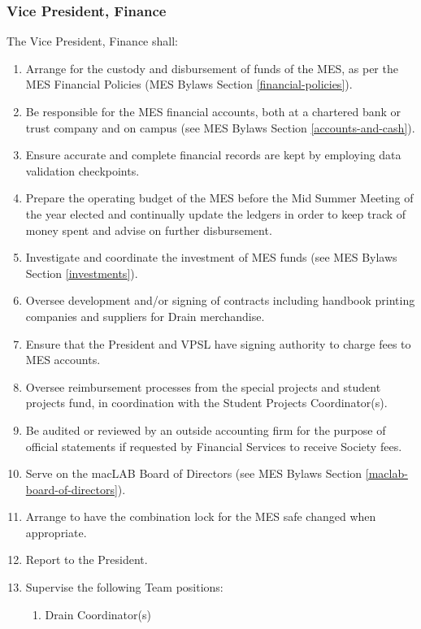 \subsubsection{Vice President,
 Finance}
\label{vice-president-finance}
The Vice President, Finance shall:

\begin{enumerate}
 \item
  Arrange for the custody and disbursement of funds of the MES, as per the MES Financial Policies (MES Bylaws Section \ref{financial-policies}).
 \item
  Be responsible for the MES financial accounts, both at a chartered bank or trust company and on campus (see MES Bylaws Section \ref{accounts-and-cash}).
 \item
  Ensure accurate and complete financial records are kept by employing data validation checkpoints.
 \item
  Prepare the operating budget of the MES before the Mid Summer Meeting of the year elected and continually update the ledgers in order to keep track of money spent and advise on further disbursement.
 \item
  Investigate and coordinate the investment of MES funds (see MES Bylaws Section \ref{investments}).
 \item
  Oversee development and/or signing of contracts including handbook printing companies and suppliers for Drain merchandise.
 \item
  Ensure that the President and VPSL have signing authority to charge fees to MES accounts.
 \item
  Oversee reimbursement processes from the special projects and student projects fund, in coordination with the Student Projects Coordinator(s).
 \item
  Be audited or reviewed by an outside accounting firm for the purpose of official statements if requested by Financial Services to receive Society fees.
 \item
  Serve on the macLAB Board of Directors (see MES Bylaws Section \ref{maclab-board-of-directors}).
 \item
  Arrange to have the combination lock for the MES safe changed when appropriate.
 \item
  Report to the President.
 \item
  Supervise the following Team positions:

  \begin{enumerate}
   \item
    Drain Coordinator(s)

  \end{enumerate}
\end{enumerate}